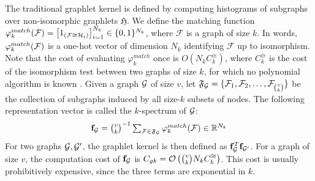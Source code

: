 \documentclass{article}
\begin{document}
The traditional graphlet kernel is defined by computing histograms of subgraphs over non-isomorphic graphlets $\mathfrak{H}$. We define the matching function $\varphi_k^{match}(\mathcal{F}) = \left[ 1_{(\mathcal{F} \cong \mathcal{H}_i)}\right]_{i=1}^{N_k} \in \{0,1\}^{N_k}$, where $\mathcal{F}$ is a graph of size $k$. In words, $\varphi^{match}_k(\mathcal{F})$ is a one-hot vector of dimension $N_k$ identifying $\mathcal{F}$ up to isomorphism. Note that the cost of evaluating $\varphi_k^{match}$ once is $O\left(N_k C^{\cong}_k\right)$, where $C^{\cong}_k$ is the cost of the isomorphism test between two graphs of size $k$, for which no polynomial algorithm is known \cite{isomorphism_np}. 
%
Given a graph $\mathcal{G}$ of size $v$, let $\mathfrak{F}_{\mathcal{G}}=\{\mathcal{F}_1,\mathcal{F}_2,\ldots,\mathcal{F}_{\binom{v}{k}}\}$ be the collection of subgraphs induced by all size-$k$ subsets of nodes. The following representation vector is called the $k$-spectrum of $\mathcal{G}$:
\begin{equation}
\label{eq:gk}
\mathsmaller{\mathbf{f}_\G=\binom{v}{k}^{-1}\sum_{\mathcal{F}\in\mathfrak{F}_\mathcal{G}} \match (\mathcal{F}) \in \R^{N_k}}
\end{equation}
For two graphs $\mathcal{G},\mathcal{G}'$, the graphlet kernel \cite{graphlet_kernel} is then defined as $\mathbf{f}_{\mathcal{G}}^T\mathbf{f}_{\mathcal{G}'}$. %
For a graph of size $v$, the computation cost of $\mathbf{f}_{\mathcal{G}}$ is $C_{gk}= \mathcal{O}\left(\tbinom{v}{k}N_k C^{\cong}_k\right)$. This cost is usually prohibitively expensive, since the three terms are exponential in $k$.
\end{document}
